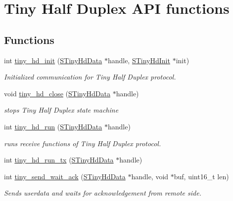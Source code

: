 \hypertarget{group__HALF__DUPLEX__API}{}\section{Tiny Half Duplex A\+PI functions}
\label{group__HALF__DUPLEX__API}
\subsection*{Functions}
\begin{DoxyCompactItemize}
\item 
int \hyperlink{group__HALF__DUPLEX__API_ga747e6a3a0b5d2a9e1fe0c143c20057e9}{tiny\+\_\+hd\+\_\+init} (\hyperlink{tiny__hd_8h_af9f81ad129b754a780dfca5dcd7f7cf9}{S\+Tiny\+Hd\+Data} $\ast$handle, \hyperlink{tiny__hd_8h_a784f1a0f0ae7f06da4bc288fa3f22408}{S\+Tiny\+Hd\+Init} $\ast$init)
\begin{DoxyCompactList}\small\item\em Initialized communication for Tiny Half Duplex protocol. \end{DoxyCompactList}\item 
void \hyperlink{group__HALF__DUPLEX__API_ga275846730a88b9654345d5defbda31e7}{tiny\+\_\+hd\+\_\+close} (\hyperlink{tiny__hd_8h_af9f81ad129b754a780dfca5dcd7f7cf9}{S\+Tiny\+Hd\+Data} $\ast$handle)
\begin{DoxyCompactList}\small\item\em stops Tiny Half Duplex state machine \end{DoxyCompactList}\item 
int \hyperlink{group__HALF__DUPLEX__API_gac962595f09883dea1dd0992a608a17b9}{tiny\+\_\+hd\+\_\+run} (\hyperlink{tiny__hd_8h_af9f81ad129b754a780dfca5dcd7f7cf9}{S\+Tiny\+Hd\+Data} $\ast$handle)
\begin{DoxyCompactList}\small\item\em runs receive functions of Tiny Half Duplex protocol. \end{DoxyCompactList}\item 
int \hyperlink{group__HALF__DUPLEX__API_ga84325cc961c3f31e2ba6111d0235bd61}{tiny\+\_\+hd\+\_\+run\+\_\+tx} (\hyperlink{tiny__hd_8h_af9f81ad129b754a780dfca5dcd7f7cf9}{S\+Tiny\+Hd\+Data} $\ast$handle)
\item 
int \hyperlink{group__HALF__DUPLEX__API_ga5aad8dcb504b80bac923496f2686a6d6}{tiny\+\_\+send\+\_\+wait\+\_\+ack} (\hyperlink{tiny__hd_8h_af9f81ad129b754a780dfca5dcd7f7cf9}{S\+Tiny\+Hd\+Data} $\ast$handle, void $\ast$buf, uint16\+\_\+t len)
\begin{DoxyCompactList}\small\item\em Sends userdata and waits for acknowledgement from remote side. \end{DoxyCompactList}\end{DoxyCompactItemize}


